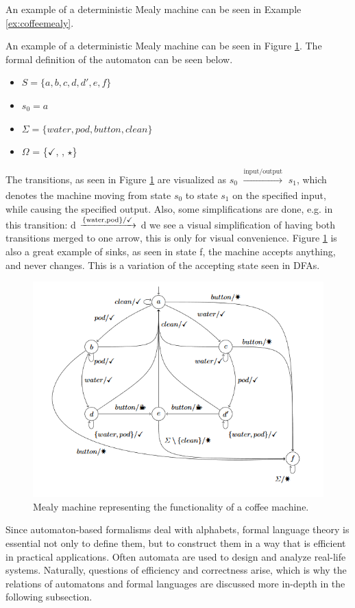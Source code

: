 An example of a deterministic Mealy machine can be seen in Example \ref{ex:coffeemealy}.

\begin{example}
	\label{ex:coffeemealy}
	An example of a deterministic Mealy machine can be seen in Figure \ref{fig:coffeemealy}. The formal definition of the automaton can be seen below.
	\begin{itemize} 
		\item $S = \{a, b, c, d, d', e, f\}$ 
		\item $s_0 = a$
		\item $\Sigma = \{water, pod, button, clean\}$
		\item $\Omega$ = \{$\checkmark$, \Coffeecup, $\star$\}
	\end{itemize}
	The transitions, as seen in Figure \ref{fig:coffeemealy} are visualized as $s_0$ $\xrightarrow[]{\text{input/output}}$ $s_1$, which denotes the machine moving from state $s_0$ to state $s_1$ on the specified input, while causing the specified output. Also, some simplifications are done, e.g. in this transition: d $\xrightarrow[]{\text{\{water,pod\}/\checkmark}}$ d we see a visual simplification of having both transitions merged to one arrow, this is only for visual convenience. Figure \ref{fig:coffeemealy} is also a great example of sinks, as seen in state f, the machine accepts anything, and never changes. This is a variation of the accepting state seen in DFAs.
\end{example}

\begin{figure}[!ht]
	\centering
	\includegraphics[width=0.7\linewidth]{figures/coffeemealy}
	\caption{Mealy machine representing the functionality of a coffee machine.\cite{Steffen2011}}
	\label{fig:coffeemealy}
\end{figure}

Since automaton-based formalisms deal with alphabets, formal language theory is essential not only to define them, but to construct them in a way that is efficient in practical applications. Often automata are used to design and analyze real-life systems. Naturally, questions of efficiency and correctness arise, which is why the relations of automatons and formal languages are discussed more in-depth in the following subsection.

